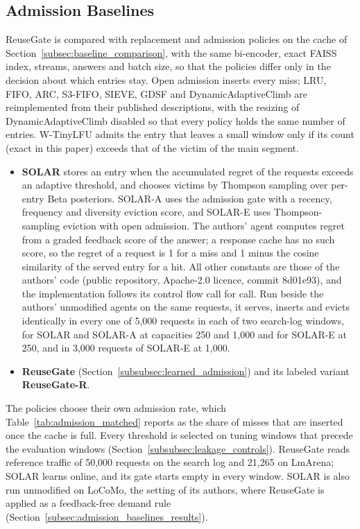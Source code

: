 \subsection{Admission Baselines}\label{subsec:admission_baselines}
ReuseGate is compared with replacement and admission policies on the cache of Section~\ref{subsec:baseline_comparison}, with the same bi-encoder, exact FAISS index, streams, answers and batch size, so that the policies differ only in the decision about which entries stay. Open admission inserts every miss; LRU, FIFO, ARC, S3-FIFO, SIEVE, GDSF and DynamicAdaptiveClimb are reimplemented from their published descriptions, with the resizing of DynamicAdaptiveClimb disabled so that every policy holds the same number of entries. W-TinyLFU admits the entry that leaves a small window only if its count (exact in this paper) exceeds that of the victim of the main segment.
\begin{itemize}
\item \textbf{SOLAR} \citep{sun2026solar} stores an entry when the accumulated regret of the requests exceeds an adaptive threshold, and chooses victims by Thompson sampling over per-entry Beta posteriors. SOLAR-A uses the admission gate with a recency, frequency and diversity eviction score, and SOLAR-E uses Thompson-sampling eviction with open admission. The authors' agent computes regret from a graded feedback score of the answer; a response cache has no such score, so the regret of a request is 1 for a miss and 1 minus the cosine similarity of the served entry for a hit. All other constants are those of the authors' code (public repository, Apache-2.0 licence, commit 8d01e93), and the implementation follows its control flow call for call. Run beside the authors' unmodified agents on the same requests, it serves, inserts and evicts identically in every one of 5,000 requests in each of two search-log windows, for SOLAR and SOLAR-A at capacities 250 and 1,000 and for SOLAR-E at 250, and in 3,000 requests of SOLAR-E at 1,000.
\item \textbf{ReuseGate} (Section~\ref{subsubsec:learned_admission}) and its labeled variant \textbf{ReuseGate-R}.
\end{itemize}
The policies choose their own admission rate, which Table~\ref{tab:admission_matched} reports as the share of misses that are inserted once the cache is full. Every threshold is selected on tuning windows that precede the evaluation windows (Section~\ref{subsubsec:leakage_controls}). ReuseGate reads reference traffic of 50,000 requests on the search log and 21,265 on LmArena; SOLAR learns online, and its gate starts empty in every window. SOLAR is also run unmodified on LoCoMo, the setting of its authors, where ReuseGate is applied as a feedback-free demand rule (Section~\ref{subsec:admission_baselines_results}).
